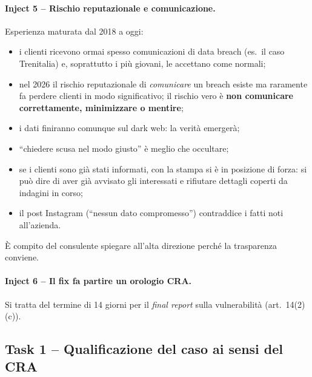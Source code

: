 \paragraph{Inject 5 -- Rischio reputazionale e comunicazione.} Esperienza maturata dal 2018 a oggi:
\begin{itemize}
  \item i clienti ricevono ormai spesso comunicazioni di data breach (es.\ il caso Trenitalia) e,
    soprattutto i più giovani, le accettano come normali;
  \item nel 2026 il rischio reputazionale di \emph{comunicare} un breach esiste ma raramente fa perdere
    clienti in modo significativo; il rischio vero è \textbf{non comunicare correttamente,
    minimizzare o mentire};
  \item i dati finiranno comunque sul dark web: la verità emergerà;
  \item ``chiedere scusa nel modo giusto'' è meglio che occultare;
  \item se i clienti sono già stati informati, con la stampa si è in posizione di forza: si può dire
    di aver già avvisato gli interessati e rifiutare dettagli coperti da indagini in corso;
  \item il post Instagram (``nessun dato compromesso'') contraddice i fatti noti all'azienda.
\end{itemize}
È compito del consulente spiegare all'alta direzione perché la trasparenza conviene.

\paragraph{Inject 6 -- Il fix fa partire un orologio CRA.} Si tratta del termine di 14 giorni per il
\emph{final report} sulla vulnerabilità (art.~14(2)(c)).

\subsection{Task 1 -- Qualificazione del caso ai sensi del CRA}

